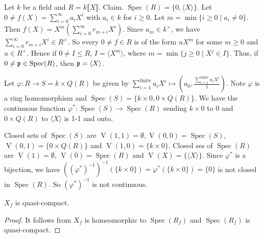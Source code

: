 \begin{example*}
    Let $k$ be a field and $R = k\llbracket X \rrbracket$. Claim. $\operatorname{Spec}(R) = \{0,\langle X \rangle\}$. Let $0 \neq f(X) = \sum_{i=0}^\infty a_iX^i$ with $a_i \in k$ for $i \geq 0$. Let $m = \min \{i \geq 0 \mid a_i \neq 0\}$. Then $f(X) = X^m(\sum_{i=0}^{\infty}r_{m+i}X^{i})$. Since $a_m \in k^\times$, we have $\sum_{i=0}^{\infty}r_{m+i}X^{i} \in R^\times$. So every $0 \neq f \in R$ is of the form $uX^m$ for some $m \geq 0$ and $u \in R^\times$. Hence if $0 \neq I \leq R$, $I = \langle X^m \rangle$, where $m = \min\{j \geq 0 \mid X^j \in I\}$. Thus, if $0 \neq \mathfrak{p} \in \operatorname{Spec}(R)$, then $\mathfrak{p} = \langle X \rangle$. \par 
    Let $\varphi: R \to S = k \times Q(R)$ be given by $\sum_{i=1}^{\text{finite}} a_iX^i \mapsto (a_0,\frac{\sum_{i=1}^{\text{finite}} a_iX^i}{1})$. Note $\varphi$ is a ring homomorphism and $\operatorname{Spec}(S) = \{k \times 0, 0 \times Q(R)\}$. We have the continuous function $\varphi^*: \operatorname{Spec}(S) \to \operatorname{Spec}(R)$  sending $k \times 0$ to $0$ and $0 \times Q(R)$ to $\langle X \rangle$ is 1-1 and onto. \par 
    Closed sets of $\operatorname{Spec}(S)$ are $\operatorname{V}(1,1) = \emptyset, \operatorname{V}(0,0) = \operatorname{Spec}(S)$, $\operatorname{V}(0,1) = \{0 \times Q(R)\}$ and $\operatorname{V}(1,0) = \{k \times 0\}$. Closed ses of $\operatorname{Spec}(R)$ are $\operatorname{V}(1) = \emptyset$, $\operatorname{V}(0) = \operatorname{Spec}(R)$ and $\operatorname{V}(X) = \{\langle X \rangle\}$. Since $\varphi^*$ is a bijection, we have $((\varphi^*)^{-1})^{-1}(\{k \times 0\}) = \varphi^*(\{k \times 0\}) = \{0\}$ is not closed in $\operatorname{Spec}(R)$. So $(\varphi^*)^{-1}$ is not continuous. 
\end{example*}

\begin{corollary}
    $X_f$ is quasi-compact.
\end{corollary}

\begin{proof}
    It follows from $X_f$ is homeomorphic to $\operatorname{Spec}(R_f)$ and $\operatorname{Spec}(R_f)$ is quasi-compact.
\end{proof}


